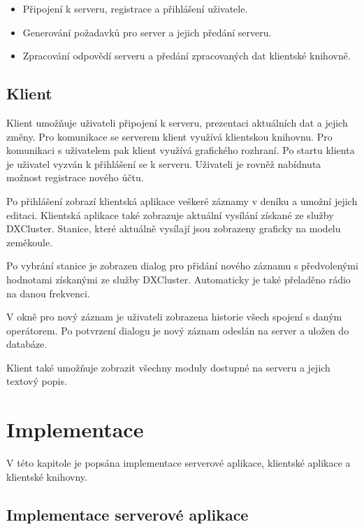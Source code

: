 \begin{itemize}
\item Připojení k serveru, registrace a přihlášení uživatele.
\item Generování požadavků pro server a jejich předání serveru.
\item Zpracování odpovědí serveru a předání zpracovaných dat klientské knihovně.
\end{itemize}

\section{Klient}
\label{navrh_klient}

Klient umožňuje uživateli připojení k serveru, prezentaci aktuálních dat a
jejich změny. Pro komunikace
se serverem klient využívá klientskou knihovnu. Pro komunikaci s uživatelem pak klient využívá grafického rozhraní.
Po startu klienta je uživatel vyzván k přihlášení se k serveru. Uživateli je rovněž nabídnuta možnost registrace
nového účtu.

Po přihlášení zobrazí klientská aplikace veškeré záznamy v deníku a umožní jejich editaci. Klientská aplikace také zobrazuje
aktuální vysílání získané ze služby DXCluster. Stanice, které aktuálně vysílají jsou zobrazeny graficky na modelu 
zeměkoule.

Po vybrání stanice je zobrazen dialog pro přidání nového záznamu s předvolenými hodnotami získanými ze služby DXCluster. Automaticky
je také přeladěno rádio na danou frekvenci.

V okně pro nový záznam je uživateli zobrazena historie všech spojení s daným operátorem.
Po potvrzení dialogu je nový záznam odeslán na server a uložen do databáze.

Klient také umožňuje zobrazit všechny moduly dostupné na serveru a jejich
textový popis.


\chapter{Implementace}
\label{implementace}

V této kapitole je popsána implementace serverové aplikace, klientské aplikace a klientské knihovny.

\section{Implementace serverové aplikace}
\label{implementace_server}

